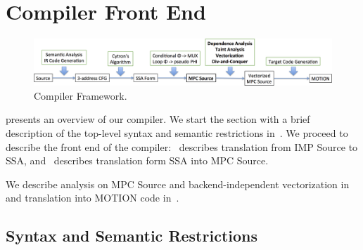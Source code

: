 

\section{\bf Compiler Front End}
\label{sec:compiler}



\begin{figure}
  \includegraphics[width=0.9\linewidth]{figs_paper_SIMD/compiler_framework.png}
  \caption{Compiler Framework. }
  \label{fig:compiler_framework}
\end{figure}

 presents an overview of our compiler.
We start the section with a brief description of the top-level syntax and semantic restrictions in~.
We proceed to describe the front end of the compiler:~
describes translation from IMP Source to SSA, and~
describes translation form SSA into MPC Source.

We describe analysis on MPC Source and backend-independent vectorization in~
and translation into MOTION code in~.

\subsection{Syntax and Semantic Restrictions}
\label{sec:syntax}


